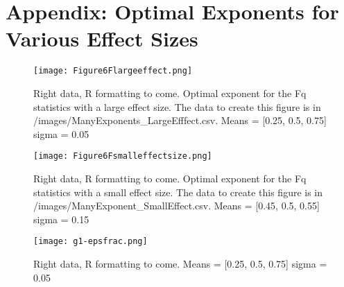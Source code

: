 
\section{Appendix: Optimal Exponents for Various Effect Sizes}

\begin{figure}
\centering
\texttt{[image: Figure6Flargeeffect.png]}
\caption{Right data, R formatting to come. Optimal exponent for the Fq statistics with a large effect size. The data to create this figure is in /images/ManyExponents_LargeEfffect.csv. Means = [0.25, 0.5, 0.75] sigma = 0.05}
\end{figure}

\begin{figure}
\centering
\texttt{[image: Figure6Fsmalleffectsize.png]}
\caption{Right data, R formatting to come. Optimal exponent for the Fq statistics with a small effect size. The data to create this figure is in /images/ManyExponent_SmallEffect.csv. Means = [0.45, 0.5, 0.55] sigma = 0.15}
\end{figure}

\begin{figure}
\centering
\texttt{[image: g1-epsfrac.png]}
\caption{Right data, R formatting to come. Means = [0.25, 0.5, 0.75] sigma = 0.05}
\end{figure}

